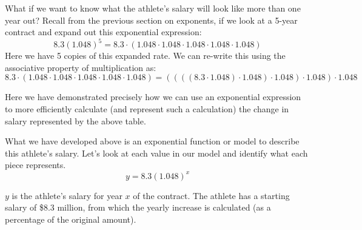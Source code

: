 \documentclass{ximera}
\begin{document}
What if we want to know what the athlete's salary will look like more than one year out? Recall from the previous section on exponents, if we look at a 5-year contract and expand out this exponential expression:
%
\begin{equation*}
8.3(1.048)^5 = 8.3 \cdot (1.048 \cdot 1.048 \cdot 1.048 \cdot 1.048  \cdot 1.048)
\end{equation*}
%
Here we have 5 copies of this expanded rate. We can re-write this using the associative property of multiplication as: 
%
\begin{equation*}
8.3 \cdot (1.048 \cdot 1.048 \cdot 1.048 \cdot 1.048 \cdot 1.048) = ((((8.3 \cdot 1.048) \cdot 1.048)  \cdot 1.048) \cdot 1.048) \cdot 1.048
\end{equation*}

Here we have demonstrated precisely how we can use an exponential expression to more efficiently calculate (and represent such a calculation) the change in salary represented by the above table.

What we have developed above is an exponential function or model to describe this athlete's salary.  Let's look at each value in our model and identify what each piece represents.
$$
y = 8.3(1.048)^x
$$

$y$ is the athlete's salary for year $x$ of the contract. The athlete has a starting salary of \$8.3 million, from which the yearly increase is calculated (as a percentage of the original amount). 
\end{document}
